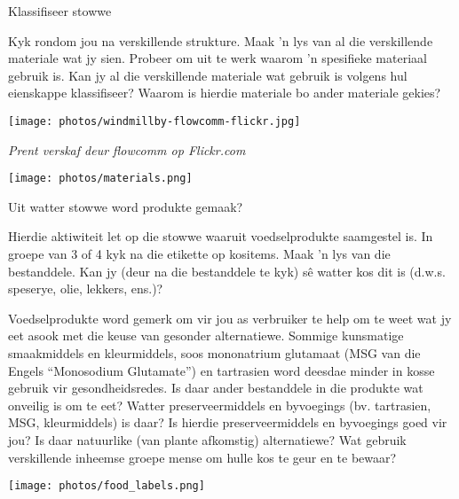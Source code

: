 \begin{activity}{Klassifiseer stowwe} {
\begin{minipage}{.4\textwidth}
Kyk rondom jou na verskillende strukture. Maak 'n lys van al die verskillende materiale wat jy sien. Probeer om uit te werk waarom 'n spesifieke materiaal gebruik is. Kan jy al die verskillende materiale wat gebruik is volgens hul eienskappe klassifiseer? Waarom is hierdie materiale bo ander materiale gekies?
\end{minipage}
\begin{minipage}{.3\textwidth}
\begin{center}
 \texttt{[image: photos/windmillby-flowcomm-flickr.jpg]}\par
\textit{Prent verskaf deur flowcomm op Flickr.com}
\end{center}
\end{minipage}
\begin{minipage}{.3\textwidth}
\begin{center}
 \texttt{[image: photos/materials.png]}\par
\end{center}
\end{minipage}
}
\end{activity}

\begin{activity}{Uit watter stowwe word produkte gemaak?}
{

Hierdie aktiwiteit let op die stowwe waaruit voedselprodukte saamgestel is. In groepe van 3 of 4 kyk na die etikette op kositems. Maak 'n lys van die bestanddele. Kan jy (deur na die bestanddele te kyk) s\^e watter kos dit is (d.w.s. speserye, olie, lekkers, ens.)? \\
\begin{minipage}{.6\textwidth}
Voedselprodukte word gemerk om vir jou as verbruiker te help om te weet wat jy eet asook met die keuse van gesonder alternatiewe. Sommige kunsmatige smaakmiddels en kleurmiddels, soos mononatrium glutamaat (MSG van die Engels ``Monosodium Glutamate'') en tartrasien word deesdae minder in kosse gebruik vir gesondheidsredes. Is daar ander bestanddele in die produkte wat onveilig is om te eet? Watter preserveermiddels en byvoegings (bv. tartrasien, MSG, kleurmiddels) is daar? Is hierdie preserveermiddels en byvoegings goed vir jou? Is daar natuurlike (van plante afkomstig) alternatiewe? Wat gebruik verskillende inheemse groepe mense om hulle kos te geur en te bewaar?
\end{minipage}
\begin{minipage}{.3\textwidth}
 \begin{center}
 \texttt{[image: photos/food\_labels.png]}\par
\end{center}
\end{minipage}

 }  \end{activity}


